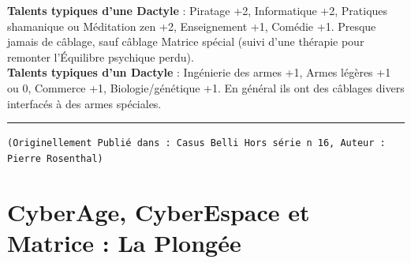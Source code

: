\documentclass[11pt,twoside,a4paper]{article}
\begin{document}
\begin{multicols}{3}
{\textbf{Talents typiques d'une Dactyle} : Piratage +2, Informatique +2, Pratiques shamanique ou M{\'e}ditation zen +2, Enseignement +1, Com{\'e}die +1. Presque jamais de c{\^a}blage, sauf c{\^a}blage Matrice sp{\'e}cial (suivi d'une th{\'e}rapie pour remonter l'{\'E}quilibre psychique perdu).~\\

\textbf{Talents typiques d'un Dactyle} : Ing{\'e}nierie des armes +1, Armes l{\'e}g{\`e}res +1 ou 0, Commerce +1, Biologie/g{\'e}n{\'e}tique +1. En g{\'e}n{\'e}ral ils ont des c{\^a}blages divers interfac{\'e}s {\`a} des armes sp{\'e}ciales. 

\begin{center} \rule{4cm}{0.5mm} \end{center}

\texttt{\scriptsize{(Originellement Publi{\'e} dans : Casus Belli Hors s{\'e}rie n 16, Auteur : Pierre Rosenthal)}}

} %
\end{multicols} 

\clearpage

\section{CyberAge, CyberEspace et Matrice : La Plong{\'e}e}
\end{document}
